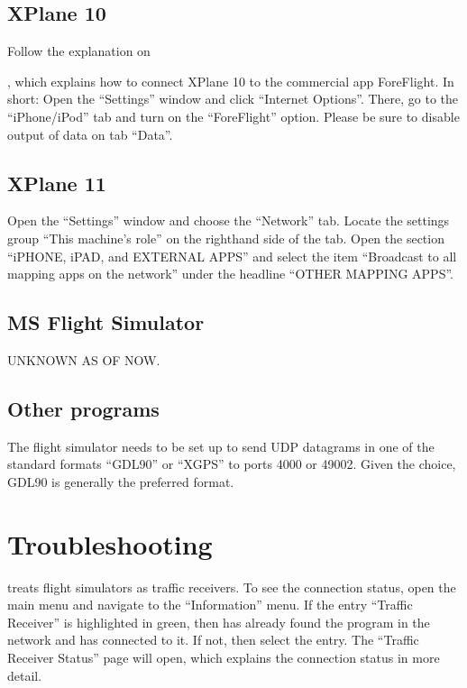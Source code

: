 \documentclass[letterpaper,10pt,english]{sphinxmanual}
\begin{document}
\subsection{X\sphinxhyphen{}Plane 10}
\label{\detokenize{02-steps/simulator:id1}}
\sphinxAtStartPar
Follow the explanation on %
\begin{footnote}[15]\sphinxAtStartFootnote
{}
%
\end{footnote},
which explains how to connect X\sphinxhyphen{}Plane 10 to the commercial app ForeFlight.  In
short: Open the “Settings” window and click “Internet Options”. There, go to the
“iPhone/iPod” tab and turn on the “ForeFlight” option.  Please be sure to
disable output of data on tab “Data”.

\noindent{}


\subsection{X\sphinxhyphen{}Plane 11}
\label{\detokenize{02-steps/simulator:id2}}
\sphinxAtStartPar
Open the “Settings” window and choose the “Network” tab.  Locate the settings
group “This machine’s role” on the right\sphinxhyphen{}hand side of the tab. Open the section
“iPHONE, iPAD, and EXTERNAL APPS” and select the item “Broadcast to all mapping
apps on the network” under the headline “OTHER MAPPING APPS”.

\noindent{}


\subsection{MS Flight Simulator}
\label{\detokenize{02-steps/simulator:ms-flight-simulator}}
\sphinxAtStartPar
UNKNOWN AS OF NOW.


\subsection{Other programs}
\label{\detokenize{02-steps/simulator:other-programs}}
\sphinxAtStartPar
The flight simulator needs to be set up to send UDP datagrams in one of the
standard formats “GDL90” or “XGPS” to ports 4000 or 49002.  Given the choice,
GDL90 is generally the preferred format.


\section{Troubleshooting}
\label{\detokenize{02-steps/simulator:troubleshooting}}
\sphinxAtStartPar
{} treats flight simulators as traffic receivers.  To
see the connection status, open the main menu and navigate to the “Information”
menu.  If the entry “Traffic Receiver” is highlighted in green, then  has already found the program in the network and has
connected to it.  If not, then select the entry. The “Traffic Receiver Status”
page will open, which explains the connection status in more detail.
\end{document}

